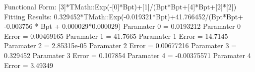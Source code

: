 Functional Form: [3]*TMath::Exp(-[0]*Bpt)+[1]/(Bpt*Bpt+[4]*Bpt+[2]*[2])
Fitting Results: 0.329452*TMath::Exp(-0.019321*Bpt)+41.766452/(Bpt*Bpt+ -0.003756 * Bpt + 0.000029*0.000029)
Paramater 0 = 0.0193212
Paramater 0 Error = 0.00469165
Paramater 1 = 41.7665
Paramater 1 Error = 14.7145
Paramater 2 = 2.85315e-05
Paramater 2 Error = 0.00677216
Paramater 3 = 0.329452
Paramater 3 Error = 0.107854
Paramater 4 = -0.00375571
Paramater 4 Error = 3.49349
